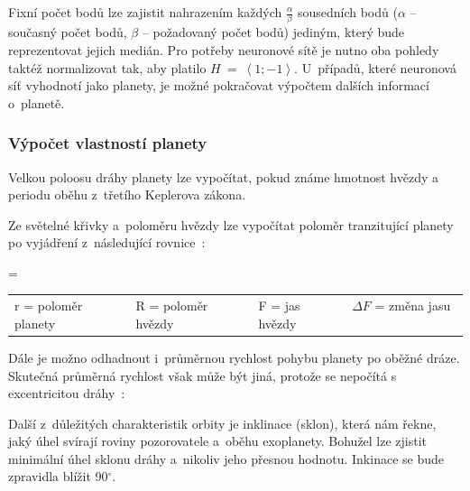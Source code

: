 \documentclass[a4paper,12pt]{article}
\begin{document}
{{Fixní počet bodů lze zajistit nahrazením každých $\frac{\alpha}{\beta}$ sousedních bodů ($\alpha$ -- současný počet bodů, $\beta$ -- požadovaný počet bodů) jediným, který bude reprezentovat jejich medián. Pro potřeby neuronové sítě je nutno oba pohledy taktéž normalizovat tak, aby platilo $H~=~\left<1; -1\right>$. U~případů, které neuronová síť vyhodnotí jako planety, je možné pokračovat výpočtem dalších informací o~planetě.~\cite{kepler80}

\subsubsection{Výpočet vlastností planety}

Velkou poloosu dráhy planety lze vypočítat, pokud známe hmotnost hvězdy a periodu oběhu z~třetího Keplerova zákona.~\cite{transitprops}


Ze světelné křivky a~poloměru hvězdy lze vypočítat poloměr tranzitující planety po vyjádření z~následující rovnice~\cite{transit,transitprops}:

 { = }{
\begin{tabular}{llll}
	r = poloměr planety & R = poloměr hvězdy & F = jas hvězdy & $\Delta F$ = změna jasu \
\end{tabular}
}

Dále je možno odhadnout i~průměrnou rychlost pohybu planety po oběžné dráze. Skutečná průměrná rychlost však může být jiná, protože se nepočítá s excentricitou dráhy~\cite{transitprops}:


Další z~důležitých charakteristik orbity je inklinace (sklon), která nám řekne, jaký úhel svírají roviny pozorovatele a~oběhu exoplanety. Bohužel lze zjistit minimální úhel sklonu dráhy a~nikoliv jeho přesnou hodnotu. Inkinace se bude zpravidla blížit 90$^{\circ}$.~\cite{transitprops}

}}
\end{document}
